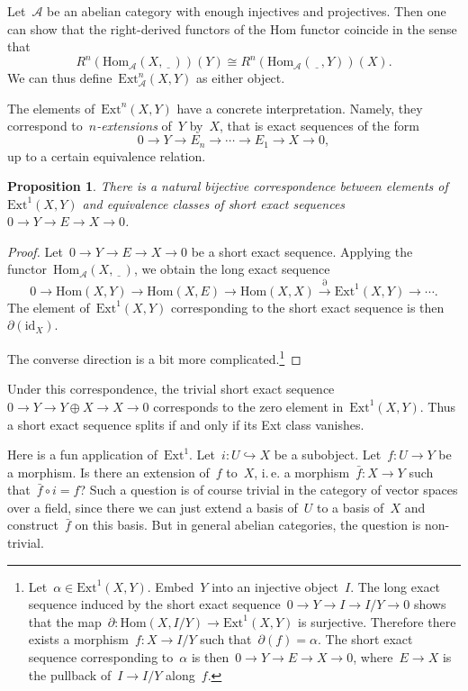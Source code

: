 \documentclass{amsart}
\makeatletter
\theoremstyle{definition}
\theoremstyle{plain}
\newtheorem{prop}[defn]{Proposition}
\theoremstyle{remark}
\newcommand{\A}{\mathcal{A}}
\newcommand{\Ext}{\mathrm{Ext}}
\newcommand{\Hom}{\mathrm{Hom}}
\newcommand{\id}{\mathrm{id}}
\newcommand{\placeholder}{\underline{\ \ \ }}
\newcommand{\?}{\,{:}\,}
\renewcommand{\_}{\mathpunct{.}\,}
\newcommand{\lra}{\longrightarrow}
\newcommand{\ie}{i.\,e.\@\xspace}
\makeatother
\begin{document}
Let~$\A$ be an abelian category with enough injectives and projectives. Then
one can show that the right-derived functors of the Hom functor coincide in the
sense that
\[ R^n(\Hom_\A(X,\placeholder))(Y) \cong R^n(\Hom_\A(\placeholder,Y))(X). \]
We can thus define~$\Ext^n_\A(X,Y)$ as either object.

The elements of~$\Ext^n(X,Y)$ have a concrete interpretation. Namely, they
correspond to~\emph{$n$-extensions} of~$Y$ by~$X$, that is exact sequences of
the form
\[ 0 \lra Y \lra E_n \lra \cdots \lra E_1 \lra X \lra 0, \]
up to a certain equivalence relation.

\begin{prop}There is a natural bijective correspondence between elements
of~$\Ext^1(X,Y)$ and equivalence classes of short exact sequences~$0 \to Y
\to E \to X \to 0$.\end{prop}
\begin{proof}Let~$0 \to Y \to E \to X \to 0$ be a short exact sequence.
Applying the functor~$\Hom_\A(X,\placeholder)$, we obtain the long exact
sequence
\[ 0 \to \Hom(X,Y) \to \Hom(X,E) \to \Hom(X,X) \stackrel{\partial}{\to}
\Ext^1(X,Y) \to \cdots. \]
The element of~$\Ext^1(X,Y)$ corresponding to the short exact sequence is
then~$\partial(\id_X)$.

The converse direction is a bit more complicated.\footnote{Let~$\alpha \in
\Ext^1(X,Y)$. Embed~$Y$ into an injective object~$I$. The long exact sequence
induced by the short exact sequence~$0 \to Y \to I \to I/Y \to 0$ shows that
the map~$\partial : \Hom(X,I/Y) \to \Ext^1(X,Y)$ is surjective. Therefore there
exists a morphism~$f : X \to I/Y$ such that~$\partial(f) = \alpha$. The short
exact sequence corresponding to~$\alpha$ is then~$0 \to Y \to E \to X \to 0$,
where~$E \to X$ is the pullback of~$I \to I/Y$ along~$f$.}
\end{proof}

Under this correspondence, the trivial short exact sequence~$0 \to Y \to Y
\oplus X \to X \to 0$ corresponds to the zero element in~$\Ext^1(X,Y)$. Thus a
short exact sequence splits if and only if its Ext class vanishes.

Here is a fun application of~$\Ext^1$. Let~$i : U \hookrightarrow X$ be a
subobject. Let~$f : U \to Y$ be a morphism. Is there an extension of~$f$
to~$X$, \ie a morphism~$\bar f : X \to Y$ such that~$\bar f \circ i = f$?
Such a question is of course trivial in the category of vector spaces over a
field, since there we can just extend a basis of~$U$ to a basis of~$X$ and
construct~$\bar f$ on this basis. But in general abelian categories, the
question is non-trivial.
\end{document}
